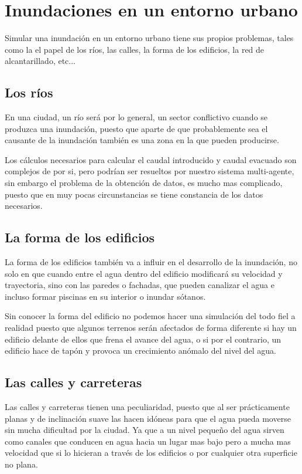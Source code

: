 \section*{Inundaciones en un entorno urbano}

Simular una inundación en un entorno urbano tiene sus propios problemas, tales
como la el papel de los ríos, las calles, la forma de los edificios, la red de
alcantarillado, etc... \cite{simulator, katrina}
\subsection*{Los ríos}
En una ciudad, un río será por lo general, un sector conflictivo cuando se
produzca una inundación, puesto que aparte de que probablemente sea el causante
de la inundación  también es una zona en la que pueden producirse.

Los cálculos necesarios para calcular el caudal introducido y caudal evacuado
\cite{desvordamiento} son complejos de por si, pero podrían ser resueltos por
nuestro sistema multi-agente, sin embargo el problema de la obtención de datos,
es mucho mas complicado, puesto que en muy pocas circunstancias se tiene
constancia de los datos necesarios.

\subsection*{La forma de los edificios}
La forma de los edificios también va a influir en el desarrollo de la
inundación, no solo en que cuando entre el agua dentro del edificio modificará
su velocidad y trayectoria, sino con las paredes o fachadas, que pueden
canalizar el agua e incluso formar piscinas en su interior o inundar sótanos.

Sin conocer la forma del edificio no podemos hacer una simulación del todo fiel
a realidad puesto que algunos terrenos serán afectados de forma diferente si
hay un edificio delante de ellos que frena el avance del agua, o si por el
contrario, un edificio hace de tapón y provoca un crecimiento anómalo del nivel
del agua.

\subsection*{Las calles y carreteras}
Las calles y carreteras tienen una peculiaridad, puesto que al ser
prácticamente planas y de inclinación suave las hacen idóneas para que el agua
pueda moverse sin mucha dificultad por la ciudad. Ya que a un nivel pequeño del
agua sirven como canales que conducen en agua hacia un lugar mas bajo pero a
mucha mas velocidad que si lo hicieran a través de los edificios o por cualquier
otra superficie no plana.

